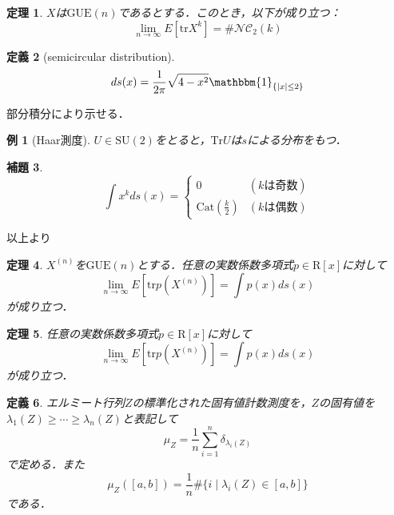 \documentclass{ltjsarticle}
\makeatletter
\theoremstyle{mystyle1}
\newtheorem{dfn}{定義}[section]
\newtheorem{thm}[dfn]{定理}
\newtheorem{lem}[dfn]{補題}
\theoremstyle{mystyle2}
\newtheorem{example}{例}
\theoremstyle{mystyle3}
\renewenvironment{proof}[1][\proofname]{\par
  \pushQED{\qed}%
  \normalfont
  \topsep6\p@\@plus6\p@ \trivlist
  \item[\hskip\labelsep{\bfseries\sffamily #1}]\ignorespaces
}{%
  \popQED\endtrivlist\@endpefalse
}
\renewcommand\proofname{証明}
\makeatother
\begin{document}
\begin{thm}
    $X$は$\mathrm{GUE}(n)$であるとする．このとき，以下が成り立つ：
    \begin{equation}
        \lim_{n\to\infty}E[\mathrm{tr} X^k]=\#\mathcal{NC}_2(k)
    \end{equation}
\end{thm}

\begin{dfn}[semicircular distribution]
    \begin{equation}
        ds(x)=\frac{1}{2\pi}\sqrt{4-x^2}\mathbbm{1}_{\{|x|\leq2\}}
    \end{equation}
\end{dfn}

\begin{proof}
    部分積分により示せる．
\end{proof}

\begin{example}[Haar測度]
    $U\in\mathrm{SU}(2)$をとると，$\mathrm{Tr}U$は$s$による分布をもつ．
\end{example}

\begin{lem}
    \begin{equation}
        \int x^k ds(x)=\begin{cases}
            0                         & (kは奇数) \\
            \mathrm{Cat}(\frac{k}{2}) & (kは偶数)
        \end{cases}
    \end{equation}
\end{lem}

以上より

\begin{thm}
    $X^{(n)}$を$\mathrm{GUE}(n)$とする．任意の実数係数多項式$p\in\mathrm{R}[x]$に対して
    \begin{equation}
        \lim_{n\to\infty}E[\mathrm{tr}p(X^{(n)})]=\int p(x)ds(x)
    \end{equation}
    が成り立つ．
\end{thm}

\begin{thm}
    任意の実数係数多項式$p\in\mathrm{R}[x]$に対して
    \begin{equation}
        \lim_{n\to\infty}E[\mathrm{tr}p(X^{(n)})]=\int p(x)ds(x)
    \end{equation}
    が成り立つ．
\end{thm}


\begin{dfn}
    エルミート行列$Z$の標準化された固有値計数測度を，$Z$の固有値を$\lambda_1(Z)\geq\cdots\geq\lambda_n(Z)$と表記して
    \begin{equation}
        \mu_Z=\frac{1}{n}\sum_{i=1}^n\delta_{\lambda_i(Z)}
    \end{equation}
    で定める．また
    \begin{equation}
        \mu_Z([a,b])=\frac{1}{n}\#\{i\mid\lambda_i(Z)\in[a,b]\}
    \end{equation}
    である．
\end{dfn}
\end{document}
